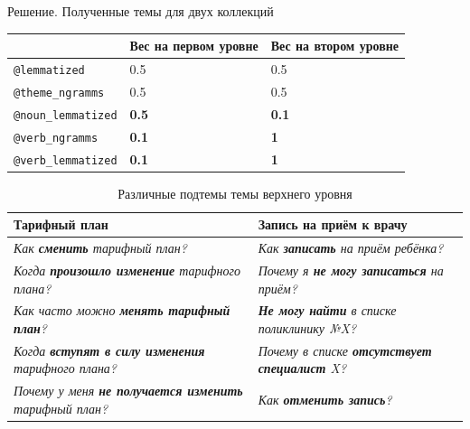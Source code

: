 \begin{frame}[t]{Решение. Полученные темы для двух коллекций}
\begin{table}[!t]
\begin{tabular}{|l|l|l|}\hline
                & Вес на первом уровне & Вес на втором уровне \\ \hline
\texttt{@lemmatized}     & 0.5                  & 0.5                  \\ \hline
 \texttt{@theme\_ngramms}   & 0.5                  & 0.5                  \\ 
\texttt{@noun\_lemmatized} & \textbf{0.5}                  & \textbf{0.1}                 \\ \hline
\texttt{@verb\_ngramms}    & \textbf{0.1}                  & \textbf{1}                    \\ 
\texttt{@verb\_lemmatized} & \textbf{0.1}                  & \textbf{1}                    \\ \hline
\end{tabular}
\end{table}

\footnotesize
\begin{table}[!h]
\begin{tabularx}{\textwidth}{|X|X|}
  \hline
  \textbf{Тарифный план} & \textbf{Запись на приём к врачу} \\
  \hline
  \textsl{Как \textbf{сменить} тарифный план?} &   \textsl{Как \textbf{записать} на приём ребёнка?}\\
  \textsl{Когда \textbf{произошло изменение} тарифного плана?} &   \textsl{Почему я \textbf{не могу записаться} на приём?}\\
  \textsl{Как часто можно \textbf{менять тарифный план}?} &  \textsl{\textbf{Не могу найти} в списке поликлинику №X?} \\
  \textsl{Когда \textbf{вступят в силу изменения} тарифного плана?} &    \textsl{Почему в списке \textbf{отсутствует специалист} X?} \\
  \textsl{Почему у меня \textbf{не получается изменить} тарифный план?} & \textsl{Как \textbf{отменить запись}?}\\
  \hline
\end{tabularx}
\caption{Различные подтемы темы верхнего уровня}
\label{topic_subtopic}
\end{table}
\normalsize

\end{frame}


